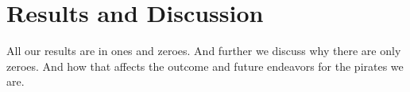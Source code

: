 \section{Results and Discussion}\label{results}
All our results are in ones and zeroes. 
And further we discuss why there are only zeroes. And how that affects the
outcome and future endeavors for the pirates we are. 

